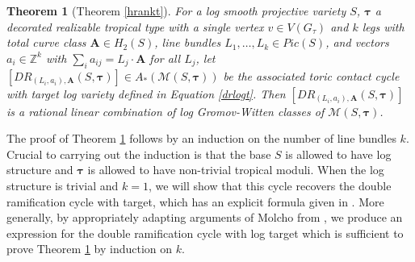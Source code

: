 \documentclass[12pt, oneside]{amsart}   	%
\newcounter{thm}
\newtheorem{remark}[thm]{Remark}
\newtheorem{theorem}[thm]{Theorem}
\newcommand{\ZZ}{\mathbb{Z}}
\numberwithin{equation}{section}
\numberwithin{thm}{section}
\numberwithin{figure}{section}
\begin{document}
\begin{theorem}[Theorem \ref{hrankt}]\label{mthm3}
For a log smooth projective variety $S$, $\pmb\tau$ a decorated realizable tropical type with a single vertex $v \in V(G_{\tau})$ and $k$ legs with total curve class $\textbf{A} \in H_2(S)$, line bundles $L_1,\ldots,L_k \in Pic(S)$, and vectors $a_i \in \ZZ^{k}$ with $\sum_i a_{ij} = L_j\cdot \textbf{A}$ for all $L_j$, let $[DR_{(L_i,a_i),\textbf{A}}(S,\pmb\tau)] \in A_*(\mathscr{M}(S,\pmb\tau))$ be the associated toric contact cycle with target log variety defined in Equation \ref{drlogt}. Then $[DR_{(L_i,a_i),\textbf{A}}(S,\pmb\tau)]$ is a rational linear combination of log Gromov-Witten classes of $\mathscr{M}(S,\pmb\tau)$. 
\end{theorem}


The proof of Theorem \ref{mthm3} follows by an induction on the number of line bundles $k$. Crucial to carrying out the induction is that the base $S$ is allowed to have log structure and $\pmb\tau$ is allowed to have non-trivial tropical moduli. When the log structure is trivial and $k=1$, we will show that this cycle recovers the double ramification cycle with target, which has an explicit formula given in \cite{DRtarget}. More generally, by appropriately adapting arguments of Molcho from \cite{BNtaut}, we produce an expression for the double ramification cycle with log target which is sufficient to prove Theorem \ref{mthm3} by induction on $k$.


\end{document}
